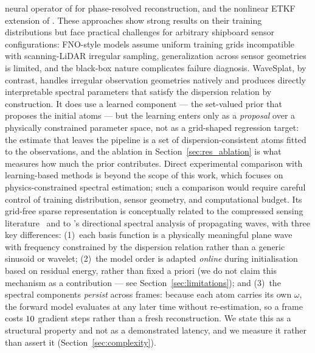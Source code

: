 \documentclass[review]{elsarticle}
\begin{document}
neural operator of \citet{ehlers2024} for phase-resolved
reconstruction, and the nonlinear ETKF extension of
\citet{desmars2023jfm}.  These approaches show strong results on
their training distributions but face practical challenges for
arbitrary shipboard sensor configurations: FNO-style models assume
uniform training grids incompatible with scanning-LiDAR irregular
sampling, generalization across sensor geometries is limited, and
the black-box nature complicates failure diagnosis.
WaveSplat, by contrast, handles irregular observation geometries natively and
produces directly interpretable spectral parameters that satisfy the dispersion
relation by construction. It does use a learned component --- the set-valued
prior that proposes the initial atoms --- but the learning enters only as a
\emph{proposal} over a physically constrained parameter space, not as a
grid-shaped regression target: the estimate that leaves the pipeline is a set of
dispersion-consistent atoms fitted to the observations, and the ablation in
Section~\ref{sec:res_ablation} is what measures how much the prior contributes.
Direct experimental comparison with learning-based methods is beyond
the scope of this work, which focuses on physics-constrained spectral
estimation; such a comparison would require careful control of
training distribution, sensor geometry, and computational budget.
Its grid-free sparse representation is conceptually related to the
compressed sensing literature~\citep{candes2006, mallat1993} and to
\citet{donelan1996}'s directional spectral analysis of propagating
waves, with three key differences: (1)~each basis function is a
physically meaningful plane wave with frequency constrained by the
dispersion relation rather than a generic sinusoid or wavelet;
(2)~the model order is adapted \emph{online} during initialisation based
on residual energy, rather than fixed a priori
(we do not claim this mechanism as a contribution --- see
Section~\ref{sec:limitations}); and
(3)~the spectral components \emph{persist} across frames: because each atom carries
its own $\omega$, the forward model evaluates at any later time without
re-estimation, so a frame costs $10{}$ gradient steps rather than a
fresh reconstruction. We state this as a structural property and not as a
demonstrated latency, and we measure it rather than assert it
(Section~\ref{sec:complexity}).
\end{document}
